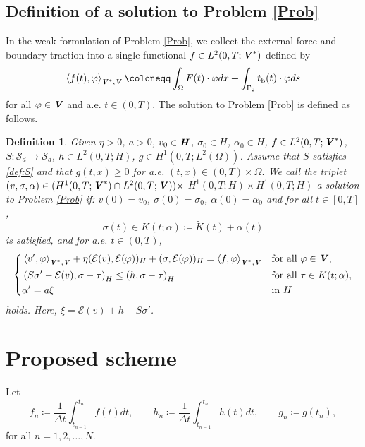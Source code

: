 \documentclass[11pt, a4paper]{article}
\newtheorem{definition}[Th]{Definition}
\newcommand{\Sym}{{\mathcal S}}
\newcommand{\defeq}{\coloneqq}
\newcommand{\into}{\int_\Omega}
\newcommand{\dt}{{\Delta t}}
\newcommand{\E}{{\mathcal{E}}}
\newcommand{\Lo}{{L^2(\Omega)}}
\newcommand{\bm}[1]{\textbf{\textit{#1}}}%
\newcommand{\Hv}{{\bm{H}}}
\newcommand{\Vv}{{\bm{V}}}
\newcommand{\Hs}{{H}}
\newcommand{\blaket}[2]{ \left\langle {#1},{#2}\right\rangle_{\Vv^*,\Vv} }
\begin{document}
\subsection{Definition of a solution to Problem \ref{Prob}}

In the weak formulation of Problem \ref{Prob}, we collect the external force and boundary traction into a single functional $f\in L^2(0,T;\Vv^*)$ defined by
\begin{align*}
    \blaket{f(t)}{\varphi}
    \defeq \into F(t)\cdot\varphi dx + \int_{\Gamma_2} t_{\rm b}(t)\cdot\varphi ds
\end{align*}
for all $\varphi\in\Vv$ and a.e. $t\in(0,T)$.
The solution to Problem \ref{Prob} is defined as follows.

\begin{definition}
    Given $\eta>0$, $a > 0$, $v_0\in\Hv$, $\sigma_0\in\Hs$, $\alpha_0\in\Hs$, $f\in L^2(0,T;\Vv^*)$, $S:\Sym_d\rightarrow\Sym_d$, $h\in L^2(0,T;\Hs)$, $g\in H^1(0,T;\Lo)$. Assume that $S$ satisfies \eqref{def:S} and that $g(t,x)\ge0$  for a.e. $(t,x)\in(0,T)\times\Omega$.
    We call the triplet $(v, \sigma, \alpha)\in (H^1(0,T;\Vv^*)\cap L^2(0,T;\Vv)) \times$ $H^1(0,T;\Hs) \times H^1(0,T;\Hs)$ a solution to Problem \ref{Prob} if:
    $v(0)=v_0$, $\sigma(0)=\sigma_0$, $\alpha(0)=\alpha_0$ and for all $t\in[0,T]$,
    \[
        \sigma(t) \in K(t;\alpha) \defeq \tilde{K}(t) + \alpha(t)
    \]
    is satisfied, and for a.e. $t\in(0,T)$,
    \begin{align}\label{sys:Prob}\left\{\begin{aligned}
        &\blaket{v'}{\varphi}
        + \eta (\E(v),\E(\varphi))_\Hs + (\sigma,\E(\varphi))_\Hs
        = \blaket{f}{\varphi} 
        &&\mbox{for all }\varphi\in\Vv,\\
        &\left(S\sigma'-\E(v),\sigma-\tau\right)_\Hs 
        \le \left(h,\sigma-\tau\right)_\Hs
        &&\mbox{for all }\tau\in K(t;\alpha),\\
        &\alpha' = a\xi
        &&\mbox{in }\Hs
    \end{aligned}\right.
    \end{align}
    holds. Here, $\xi = \E(v) + h - S\sigma'$.
\end{definition}

\section{Proposed scheme}

Let 
\[
    f_n \defeq \frac{1}{\dt}\int_{t_{n-1}}^{t_n} f(t)dt, \qquad
    h_n \defeq \frac{1}{\dt}\int_{t_{n-1}}^{t_n} h(t)dt, \qquad
    g_n \defeq g(t_n), 
\]
for all $n=1,2,\ldots,N$.
\end{document}
